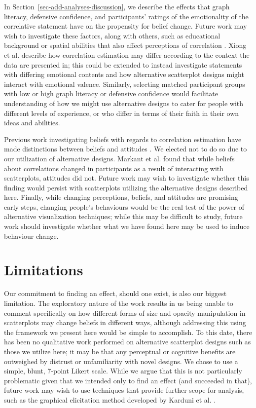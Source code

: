 \documentclass[manuscript,screen,review,anonymous]{acmart}
\begin{document}
In Section~\ref{sec-add-analyses-discussion}, we describe the effects
that graph literacy, defensive confidence, and participants' ratings of
the emotionality of the correlative statement have on the propensity for
belief change. Future work may wish to investigate these factors, along
with others, such as educational background or spatial abilities that
also affect perceptions of correlation \citep{tandon_2024}. Xiong et al.
\citep{xiong_2022} describe how correlation estimation may differ
according to the context the data are presented in; this could be
extended to instead investigate statements with differing emotional
contents and how alternative scatterplot designs might interact with
emotional valence. Similarly, selecting matched participant groups with
low or high graph literacy or defensive confidence would facilitate
understanding of how we might use alternative designs to cater for
people with different levels of experience, or who differ in terms of
their faith in their own ideas and abilities.

Previous work investigating beliefs with regards to correlation
estimation have made distinctions between beliefs and attitudes
\citep{xiong_2022, markant_2023}. We elected not to do so due to our
utilization of alternative designs. Markant et al. \citep{markant_2023}
found that while beliefs about correlations changed in participants as a
result of interacting with scatterplots, attitudes did not. Future work
may wish to investigate whether this finding would persist with
scatterplots utilizing the alternative designs described here. Finally,
while changing perceptions, beliefs, and attitudes are promising early
steps, changing people's behaviours would be the real test of the power
of alternative visualization techniques; while this may be difficult to
study, future work should investigate whether what we have found here
may be used to induce behaviour change.

\section{Limitations}\label{sec-limitations}

Our commitment to finding an effect, should one exist, is also our
biggest limitation. The exploratory nature of the work results in us
being unable to comment specifically on how different forms of size and
opacity manipulation in scatterplots may change beliefs in different
ways, although addressing this using the framework we present here would
be simple to accomplish. To this date, there has been no qualitative
work performed on alternative scatterplot designs such as those we
utilize here; it may be that any perceptual or cognitive benefits are
outweighed by distrust or unfamiliarity with novel designs. We chose to
use a simple, blunt, 7-point Likert scale. While we argue that this is
not particularly problematic given that we intended only to find an
effect (and succeeded in that), future work may wish to use techniques
that provide further scope for analysis, such as the graphical
elicitation method developed by Karduni et al.
\citep{karduni_2021, karduni_2023}.
\end{document}
